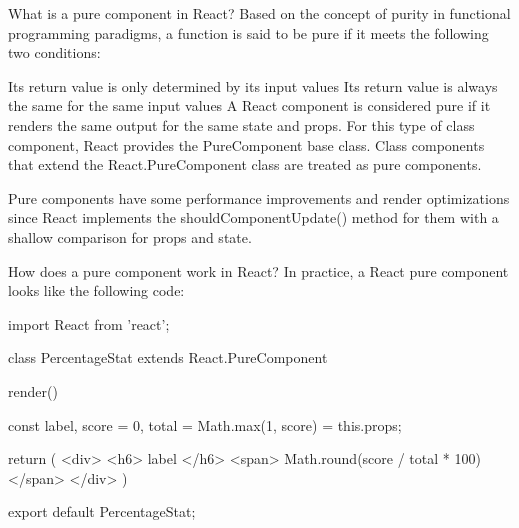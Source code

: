 

What is a pure component in React?
Based on the concept of purity in functional programming paradigms, 
a function is said to be pure if it meets the following two conditions:

Its return value is only determined by its input values
Its return value is always the same for the same input values
A React component is considered pure if it renders the same output for 
the same state and props. For this type of class component, React provides 
the PureComponent base class. Class components that extend the React.PureComponent 
class are treated as pure components.

Pure components have some performance improvements and render 
optimizations since React implements the shouldComponentUpdate() method for them 
with a shallow comparison for props and state.

How does a pure component work in React?
In practice, a React pure component looks like the following code:

import React from 'react';

class PercentageStat extends React.PureComponent {

  render() {
    const { label, score = 0, total = Math.max(1, score) } = this.props;

    return (
      <div>
        <h6>{ label }</h6>
        <span>{ Math.round(score / total * 100) }</span>
      </div>
    )
  }

}

export default PercentageStat;


